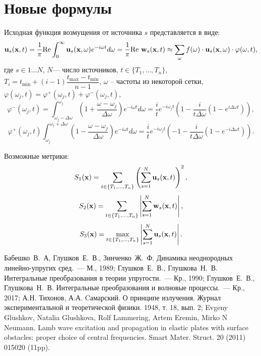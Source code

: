 \documentclass[a4paper, 12pt]{article}
\newcommand{\ww}{\omega}
\newcommand{\dw}{\Delta \omega}
\begin{document}
\section{Новые формулы}
Исходная функция возмущения от источника $s$ представляется в виде:
\begin{equation*}
    {\bf u}_s({\bf x},t)=\dfrac{1}{\pi} \mathrm{Re} \int_{0}^{\infty} {\bf u}_s({\bf x},\omega) e^{- i \omega t}d\omega=\dfrac{1}{\pi} \mathrm{Re}\ {\bf w}_s ({\bf x},t)\approx \sum_{\omega} f(\omega) \cdot {\bf u}_s({\bf x},\omega) \cdot \varphi (\omega, t) ,
\end{equation*}
где $s \in 1\dots N$, $N$--- число источников, $t \in \{T_1,\dots,T_n\}$, $T_i=t_{\min}+(i-1)\dfrac{t_{\max}-t_{\min}}{n-1}$, $\omega$ -- частоты из некоторой сетки, $\varphi(\omega_j,t)=\varphi^+(\omega_j,t)+\varphi^-(\omega_j,t)$,
\begin{equation}
    \varphi^-(\omega_j,t)=  \int_{\ww_j-\dw}^{\ww_j} \left(1+ \frac{\ww-\ww_j}{\dw} \right) e^{- i \ww t}d\ww=
    \frac{i}{t} e^{- i \ww_j t}\left(1-\frac{i}{t\dw}\left( 1-e^{i \dw t} \right)  \right), 
\end{equation}
\begin{equation}
    \varphi^+(\omega_j,t) \int_{\ww_j}^{\ww_j+\dw} \left(1- \frac{\ww-\ww_j}{\dw} \right) e^{- i \ww t}d\ww=
\frac{i}{t} e^{- i \ww_j t}\left(-1-\frac{i}{t\dw}\left( 1-e^{-i \dw t} \right)  \right).
\end{equation}


Возможные метрики:
\begin{equation}
    S_1({\bf x} )= \sum_{t \in \{T_1,\dots,T_n\}} \left(\sum_{s=1}^N {\bf u}_s ({\bf x},t)\right)^2 ,
\end{equation}
\begin{equation}
    S_2({\bf x})= \sum_{t \in \{T_1,\dots,T_n\}} \left|\sum_{s=1}^N {\bf w}_s({\bf x},t)\right|,
\end{equation}
\begin{equation}
    S_3({\bf x})= \max_{t \in \{T_1,\dots,T_n\}} \left|\sum_{s=1}^N {\bf u}_s ({\bf x},t)\right|.
\end{equation}


\begin{thebibliography}{999} 
        Бабешко~В.~А, Глушков~Е.~В., Зинченко~Ж.~Ф. Динамика неоднородных линейно-упругих сред.~---
        М., 1989;
        Глушков~Е.~В., Глушкова~Н.~В. Интегральные преобразования в теории упругости.~---
        Кр., 1990;
        Глушков~Е.~В., Глушкова~Н.~В. Интегральные преобразования и волновые процессы.~---
        Кр., 2017;
        А.Н. Тихонов, А.А. Cамарский. О принципе излучения. Журнал экспериментальной и теоретической физики. 1948, т. 18, вып. 2;
        Evgeny Glushkov, Natalia Glushkova, Rolf Lammering, Artem Eremin, Mirko N Neumann.
        Lamb wave excitation and propagation in elastic plates with surface obstacles: proper choice of central frequencies. Smart Mater. Struct. 20 (2011) 015020 (11pp).
\end{thebibliography}
\end{document}
